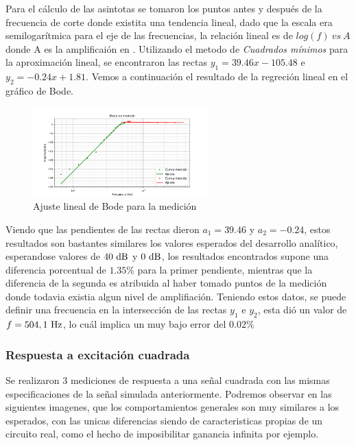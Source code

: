 Para el c\'alculo de las asintotas se tomaron los puntos antes y despu\'es de la frecuencia de corte donde existita una tendencia lineal, dado que la escala era semilogar\'itmica para el eje de las frecuencias, la relaci\'on lineal es de $log (f) \ vs\ A$ donde A es la amplificai\'on en \dB. Utilizando el metodo de \textit{Cuadrados m\'inimos} para la aproximaci\'on lineal, se encontraron las rectas $y_1=39.46x-105.48$ e $y_2=-0.24x+1.81$. Vemos a continuaci\'on el resultado de la regreci\'on lineal en el gr\'afico de Bode.

\begin{centering}
	\begin{figure}[h]
		\centering
		\includegraphics[width=0.6\textwidth]{imagenes/BodeMedicionAjuste.png}
		\caption{Ajuste lineal de Bode para la medici\'on}
	\end{figure}
\end{centering}

Viendo que las pendientes de las rectas dieron $a_1=39.46$ y $a_2=-0.24$, estos resultados son bastantes similares los valores esperados del desarrollo anal\'itico, esperandose valores de $40\dB$ y $0\dB$, los resultados encontrados supone una diferencia porcentual de $1.35\%$ para la primer pendiente, mientras que la diferencia de la segunda es atribuida al haber tomado puntos de la medici\'on donde todavia existia algun nivel de amplifiaci\'on.
Teniendo estos datos, se puede definir una frecuencia en la intersecci\'on de las rectas $y_1$ e $y_2$, esta di\'o un valor de $f=504,1 \ \si{\hertz}$, lo cu\'al implica un muy bajo error del $0.02\%$ 
\subsubsection*{Respuesta a excitaci\'on cuadrada}

Se realizaron 3 mediciones de respuesta a una señal cuadrada con las mismas especificaciones de la señal simulada anteriormente. Podremos observar en las siguientes imagenes, que los comportamientos generales son muy similares a los esperados, con las unicas diferencias siendo de caracteristicas propias de un circuito real, como el hecho de imposibilitar ganancia infinita por ejemplo.

